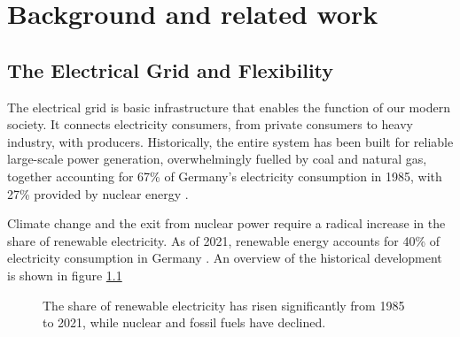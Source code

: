 
\chapter{Background and related work}

\section{The Electrical Grid and Flexibility}
The electrical grid is basic infrastructure that enables the function of our modern society.
It connects electricity consumers, from private consumers to heavy industry, with producers.
Historically, the entire system has been built for reliable large-scale power generation, overwhelmingly fuelled by coal and natural gas, together accounting for 67\% of Germany's electricity consumption in 1985, with 27\% provided by nuclear energy \cite{ritchie2022Energy}.

Climate change and the exit from nuclear power require a radical increase in the share of renewable electricity. As of 2021, renewable energy accounts for 40\% of electricity consumption in Germany \cite{ritchie2022Energy}.
An overview of the historical development is shown in figure \ref{fig:electricity_mix}

\begin{figure}
    \centering
    \caption{The share of renewable electricity has risen significantly from 1985 to 2021, while nuclear and fossil fuels have declined.}
    \label{fig:electricity_mix}
\end{figure}

